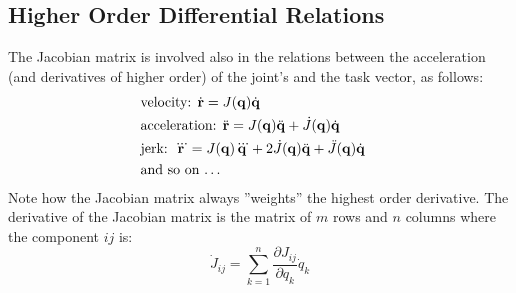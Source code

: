 \documentclass[10pt, letterpaper]{report}
\begin{document}
\subsection{Higher Order Differential Relations}
The Jacobian matrix is involved also in the relations between the acceleration (and derivatives of higher order) of the joint's and the task vector, as follows:\begin{align}
    &\text{velocity: }\dot {\mathbf r}=J(\mathbf q){\dot{\mathbf q}}& \\ 
    &\text{acceleration: }\ddot{\mathbf r}=J(\mathbf q)\ddot{\mathbf q}+\dot J(\mathbf q){\dot{\mathbf q}}&\\ 
    &\text{jerk: }\dddot{\mathbf r}=J(\mathbf q)\dddot{\mathbf q}+2\dot J(\mathbf q)\ddot{\mathbf q}+\ddot J(\mathbf q){\dot{\mathbf q}}&
    \\ &\text{and so on \dots}&
\end{align}
Note how the Jacobian matrix always ''weights'' the highest order derivative. The derivative of the Jacobian matrix is the matrix of $m$ rows and $n$ columns where the component $ij$ is:\begin{equation}
   \dot J_{ij}=\sum_{k=1}^{n}\frac{\partial J_{ij}}{\partial q_k}\dot q_k
\end{equation}
\end{document}
